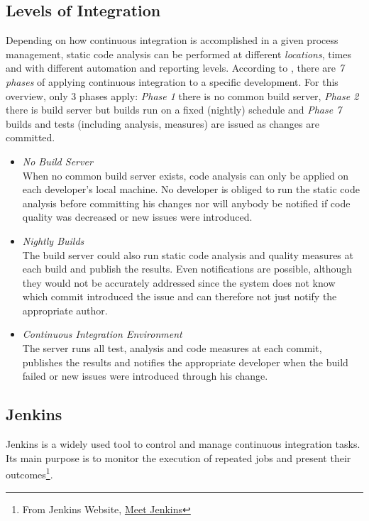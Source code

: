 \documentclass[conference]{IEEEtran}
\begin{document}
\subsection{Levels of Integration}
Depending on how continuous integration is accomplished in a given process management, static code analysis can be performed at different \textit{locations}, times and with different automation and reporting levels. According to \cite[p. 6ff]{Jenkins:Smart:2011}, there are \textit{7 phases} of applying continuous integration to a specific development. For this overview, only 3 phases apply: \textit{Phase 1} there is no common build server, \textit{Phase 2} there is build server but builds run on a fixed (nightly) schedule and \textit{Phase 7} builds and tests (including analysis, measures) are issued as changes are committed.

\begin{itemize}
	\item[1] \textit{No Build Server} \\
	When no common build server exists, code analysis can only be applied on each developer's local machine. No developer is obliged to run the static code analysis before committing his changes nor will anybody be notified if code quality was decreased or new issues were introduced.
	
	
	\item[2] \textit{Nightly Builds} \\
	The build server could also run static code analysis and quality measures at each build and publish the results. Even notifications are possible, although they would not be accurately addressed since the system does not know which commit introduced the issue and can therefore not just notify the appropriate author.
	
	\item[3] \textit{Continuous Integration Environment} \\
	The server runs all test, analysis and code measures at each commit, publishes the results and notifies the appropriate developer when the build failed or new issues were introduced through his change.
\end{itemize}



\subsection{Jenkins}
\label{subsec:jenkins}
Jenkins is a widely used tool to control and manage continuous integration tasks. Its main purpose is to monitor the execution of repeated jobs and present their outcomes\footnote{From Jenkins Website, \href{https://wiki.jenkins-ci.org/display/JENKINS/Meet+Jenkins}{Meet Jenkins}}.
\end{document}
